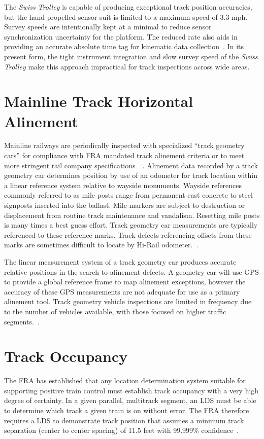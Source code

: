 The \emph{Swiss Trolley} is capable of producing exceptional track position accuracies, but the hand propelled sensor suit is limited to a maximum speed of 3.3 mph. Survey speeds are intentionally kept at a minimal to reduce sensor synchronization uncertainty for the platform. The reduced rate also aids in providing an accurate absolute time tag for kinematic data collection~\citep{2006glaus}. In its present form, the tight instrument integration and slow survey speed of the \emph{Swiss Trolley} make this approach impractical for track inspections across wide areas.

\section{Mainline Track Horizontal Alinement}Mainline railways are periodically inspected with specialized ``track geometry cars'' for compliance with FRA mandated track alinement criteria or to meet more stringent rail company specifications~\citep{49CFR213D}~\citep{2009bright}. Alinement data recorded by a track geometry car determines position by use of an odometer for track location within a linear reference system relative to wayside monuments. Wayside references commonly referred to as mile posts range from permanent cast concrete to steel signposts inserted into the ballast. Mile markers are subject to destruction or displacement from routine track maintenance and vandalism. Resetting mile posts is many times a best guess effort. Track geometry car measurements are typically referenced to these reference marks. Track defects referencing offsets from these marks are sometimes difficult to locate by Hi-Rail odometer.~\citep{2009vanPelt}.

The linear measurement system of a track geometry car produces accurate relative positions in the search to alinement defects. A geometry car will use GPS to provide a global reference frame to map alinement exceptions, however the accuracy of these GPS measurements are not adequate for use as a primary alinement tool. Track geometry vehicle inspections are limited in frequency due to the number of vehicles available, with those focused on higher traffic  segments.~\citep{2009bright}.

\section{Track Occupancy}The FRA has established that any location determination system suitable for supporting positive train control must establish track occupancy with a very high degree of certainty. In a given parallel, multitrack segment, an LDS must be able to determine which track a given train is on without error. The FRA therefore requires a LDS to demonstrate track position that assumes a minimum track separation (center to center spacing) of 11.5 feet with 99.999\% confidence~\citep[4-5]{1995FRADiffe}.

